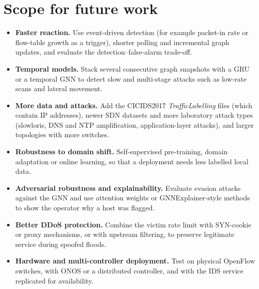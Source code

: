 \section{Scope for future work}
\begin{itemize}
	\item \textbf{Faster reaction.} Use event-driven detection (for example packet-in rate or flow-table growth as a trigger), shorter polling and incremental graph updates, and evaluate the detection--false-alarm trade-off.
	\item \textbf{Temporal models.} Stack several consecutive graph snapshots with a GRU or a temporal GNN to detect slow and multi-stage attacks such as low-rate scans and lateral movement.
	\item \textbf{More data and attacks.} Add the CICIDS2017 \emph{TrafficLabelling} files (which contain IP addresses), newer SDN datasets and more laboratory attack types (slowloris, DNS and NTP amplification, application-layer attacks), and larger topologies with more switches.
	\item \textbf{Robustness to domain shift.} Self-supervised pre-training, domain adaptation or online learning, so that a deployment needs less labelled local data.
	\item \textbf{Adversarial robustness and explainability.} Evaluate evasion attacks against the GNN and use attention weights or GNNExplainer-style methods to show the operator why a host was flagged.
	\item \textbf{Better DDoS protection.} Combine the victim rate limit with SYN-cookie or proxy mechanisms, or with upstream filtering, to preserve legitimate service during spoofed floods.
	\item \textbf{Hardware and multi-controller deployment.} Test on physical OpenFlow switches, with ONOS or a distributed controller, and with the IDS service replicated for availability.
\end{itemize}
